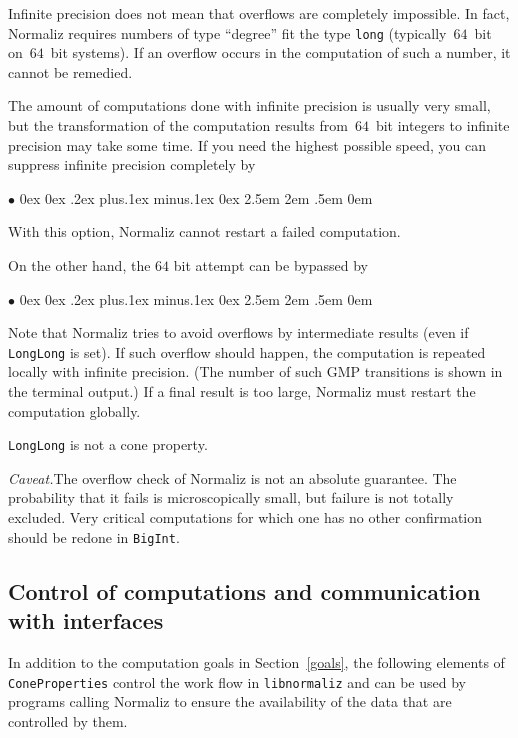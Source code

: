 \documentclass[12pt,a4paper]{scrartcl}
\newcommand{\stdli}{ \topsep0ex \partopsep0ex %
\parsep.2ex plus.1ex minus.1ex \itemsep0ex%
\leftmargin2.5em \labelwidth2em \labelsep.5em \rightmargin0em}%
\renewenvironment{itemize}{\begin{list}{{$\bullet$}}{\stdli}}{\end{list}}
\theoremstyle{definition}
\def\itemtt[#1]{\item[\textbf{\ttt{#1}}]}
\def\ttt{\texttt}
\begin{document}
Infinite precision does not mean that overflows are completely impossible. In fact, Normaliz requires numbers of type ``degree'' fit the type \verb|long| (typically~$64$~bit on~$64$~bit systems). If an overflow occurs in the computation of such a number, it cannot be remedied.

The amount of computations done with infinite precision is usually very small, but the transformation of the computation results from~$64$~bit integers to infinite precision may take some time. If you need the highest possible speed, you can suppress infinite precision completely by
\begin{itemize}
	\itemtt[LongLong]
\end{itemize}
With this option, Normaliz cannot restart a failed computation.

On the other hand, the $64$ bit attempt can be bypassed by
\begin{itemize}
	\itemtt[BigInt, -B]
\end{itemize}

Note that Normaliz tries to avoid overflows by intermediate results (even if \verb|LongLong| is set). If such overflow should happen, the computation is repeated locally with infinite precision. (The number of such GMP transitions is shown in the terminal output.) If a final result is too large, Normaliz must restart the computation globally.

\verb|LongLong| is not a cone property.

\emph{Caveat.}\enspace The overflow check of Normaliz is not an absolute guarantee. The probability that it fails is microscopically small, but failure is not totally excluded. Very critical computations for which one has no other confirmation should be redone in \verb|BigInt|.

\subsection{Control of computations and communication with interfaces}

In addition to the computation goals in Section~\ref{goals},
the following elements of \verb|ConeProperties| control the work flow in \verb|libnormaliz| and can be used by programs calling Normaliz to ensure the availability of the data that are controlled by them.
\end{document}
